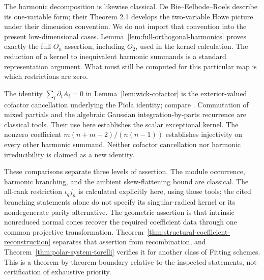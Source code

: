 The harmonic decomposition is likewise classical.  De Bie--Eelbode--Roels
\cite[\S1, equations (1)--(3)]{DeBieEelbodeRoels} describe its
one-variable form; their Theorem 2.1 develops the two-variable Howe
picture under their dimension convention.  We do not import that
convention into the present low-dimensional cases.
Lemma~\ref{lem:full-orthogonal-harmonics} proves exactly the full
\(O_n\) assertion, including \(O_2\), used in the kernel calculation.
The reduction of a kernel to inequivalent harmonic summands is a
standard representation argument.  What must still be computed for
this particular map is which restrictions are zero.

The identity \(\sum_i\partial_i A_i=0\) in
Lemma~\ref{lem:wick-cofactor} is the exterior-valued cofactor
cancellation underlying the Piola identity; compare
\cite[equation (1.1), \S3.1]{KupfermanShachar}.  Commutation of mixed
partials and the algebraic Gaussian integration-by-parts recurrence
are classical tools.  Their use here establishes the scalar exceptional
kernel.  The nonzero coefficient
\(m(n+m-2)/(n(n-1))\) establishes injectivity on every other
harmonic summand.  Neither cofactor cancellation nor harmonic
irreducibility is claimed as a new identity.

These comparisons separate three levels of assertion.  The module
occurrence, harmonic branching, and the ambient skew-flattening bound
are classical.  The all-rank restriction \(\iota_qj_n\) is calculated
explicitly here, using those tools; the cited branching statements alone
do not specify its singular-radical kernel or its nondegenerate parity
alternative.  The geometric assertion is that intrinsic nonreduced
normal cones recover the required coefficient data through one common
projective transformation.  Theorem~\ref{thm:structural-coefficient-reconstruction}
separates that assertion from recombination, and
Theorem~\ref{thm:polar-system-torelli} verifies it for another class
of Fitting schemes.  This is a theorem-by-theorem boundary relative to
the inspected statements, not certification of exhaustive priority.


